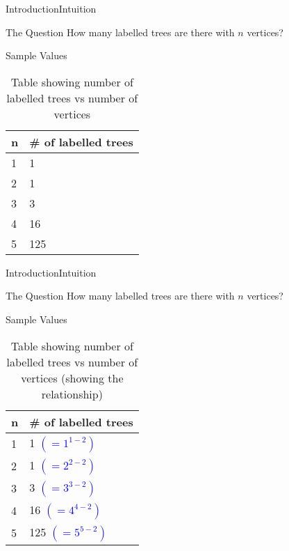 \documentclass[10pt]{beamer}
\theoremstyle{definition}
\newcommand{\Sone}{Introduction}
\newcommand{\SoneSSintuition}{Intuition}
\begin{document}
\begin{frame}{\Sone}{\SoneSSintuition}
\begin{block}{The Question}
How many labelled trees are there with $n$ vertices?
\end{block}

\pause

\begin{block}{Sample Values}
\begin{table}[]
\centering
\begin{tabular}{l|l}
n & \# of labelled trees \\ \hline
1 & 1                    \\
2 & 1                    \\
3 & 3                    \\
4 & 16                   \\
5 & 125                 
\end{tabular}
\caption{Table showing number of labelled trees vs number of vertices}
\label{tab:values}
\end{table}
\end{block}
  
\end{frame}

\begin{frame}{\Sone}{\SoneSSintuition}
\begin{block}{The Question}
How many labelled trees are there with $n$ vertices?
\end{block}

\begin{block}{Sample Values}
\begin{table}[]
\centering
\begin{tabular}{l|l}
n & \# of labelled trees                   \\ \hline
1 & 1   \textcolor{blue}{$(= 1^{1-2})$}    \\
2 & 1   \textcolor{blue}{$(= 2^{2-2})$}    \\
3 & 3   \textcolor{blue}{$(= 3^{3-2})$}    \\
4 & 16  \textcolor{blue}{$(= 4^{4-2})$}    \\
5 & 125 \textcolor{blue}{$(= 5^{5-2})$}    \\
\end{tabular}
\caption{Table showing number of labelled trees vs number of vertices (showing the relationship)}
\label{tab:values-relationship}
\end{table}
\end{block}
  
\end{frame}
\end{document}
